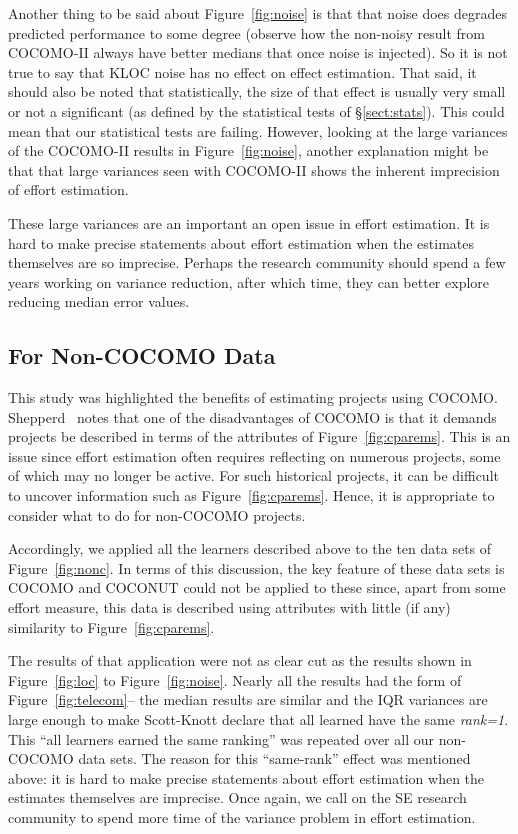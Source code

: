 \documentclass{sig-alternate}
\newcommand{\tion}[1]{\S\ref{sect:#1}}
\newcommand{\fig}[1]{Figure~\ref{fig:#1}}
\begin{document}
Another thing to be said about \fig{noise} is that that noise does
degrades predicted
performance to some degree (observe how the non-noisy result from COCOMO-II always
have better medians that once noise is injected). So it is not true to
say that KLOC noise has no effect on effect estimation.
That said, it should also be noted
that statistically, the size of that effect   is usually very small  or not
a significant (as defined by the statistical tests of \tion{stats}).
This could mean that our statistical tests are failing. However, looking at the large variances
of the COCOMO-II results in \fig{noise}, another explanation might be that
that large variances seen with COCOMO-II shows the inherent imprecision of effort
estimation. 

These large variances are an important an open issue in effort estimation.
It is hard to make precise statements about effort estimation when the estimates themselves
are so imprecise. Perhaps the research community should spend a few years  working
on variance reduction, after which time, they can better explore reducing median error values.
 
 
\subsection{For Non-COCOMO Data}\label{sect:nonc}

This study was highlighted the benefits of estimating projects using COCOMO.
Shepperd~\cite{shepperd07} notes that one of the disadvantages of COCOMO is that it demands projects be described
in terms of the attributes of \fig{cparems}. This is an issue since effort estimation often requires reflecting on
numerous projects, some of which may no longer be active. For such historical projects,
it can be difficult to uncover information such as \fig{cparems}. Hence,
it is appropriate to consider what to do for non-COCOMO projects.

Accordingly, we applied all the learners described above to the ten data sets of \fig{nonc}.
In terms of this discussion, the key feature of these data sets is   COCOMO and COCONUT could not be 
applied to these since, apart from some effort
measure, this data is described  using  attributes with little (if any)  similarity to \fig{cparems}. 

The results of that application were not as clear cut as the results shown in
\fig{loc} to \fig{noise}.  
Nearly all the results had the form of \fig{telecom}--  the median results
are similar and the IQR variances are large enough to make   Scott-Knott  
  declare that  all learned have the same {\em rank=1}. This ``all learners earned
the same ranking'' was repeated over all our non-COCOMO data sets. The reason for this
``same-rank'' effect was mentioned above: it is 
hard to make precise statements about effort estimation when the estimates themselves
are   imprecise. Once again, we call on the SE research community to spend more time
of the variance problem in effort estimation.
\end{document}
